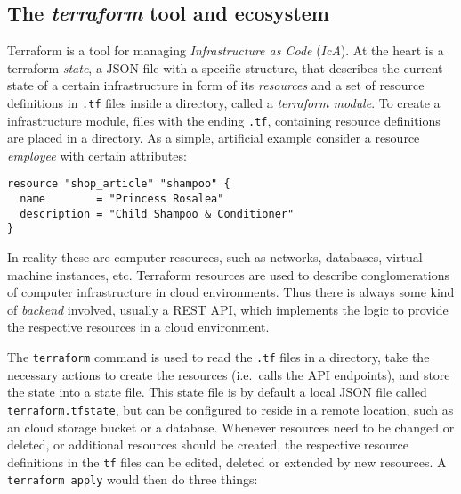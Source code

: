 \documentclass[paper=a4,fontsize=10pt,toc=listof,numbers=noenddot]{article}
\begin{document}
\subsection{The \emph{terraform} tool and ecosystem}
\label{subsec:terr-tool-ecosyst}

Terraform is a tool for managing \emph{Infrastructure as Code} (\emph{IcA}). At the heart is a terraform \emph{state}, a JSON file with a specific structure, that describes the current state of a certain infrastructure in form of its \emph{resources} and a set of resource definitions in \verb'.tf' files inside a directory, called a \emph{terraform module}. To create a infrastructure module, files with the ending \verb'.tf', containing resource definitions are placed in a directory. As a simple, artificial example consider a resource \emph{employee} with certain attributes:

\begin{lstlisting}[basicstyle=\ttfamily\footnotesize,numbers=none,frame=single]
resource "shop_article" "shampoo" {
  name        = "Princess Rosalea"
  description = "Child Shampoo & Conditioner"
}
\end{lstlisting}

In reality these are computer resources, such as networks, databases, virtual machine instances, etc. Terraform resources are used to describe conglomerations of computer infrastructure in cloud environments. Thus there is always some kind of \emph{backend} involved, usually a REST API, which implements the logic to provide the respective resources in a cloud environment.

The \verb'terraform' command is used to read the \verb'.tf' files in a directory, take the necessary actions to create the resources (i.e.\ calls the API endpoints), and store the state into a state file. This state file is by default a local JSON file called \verb'terraform.tfstate', but can be configured to reside in a remote location, such as an cloud storage bucket or a database. Whenever resources need to be changed or deleted, or additional resources should be created, the respective resource definitions in the \verb'tf' files can be edited, deleted or extended by new resources. A \verb'terraform apply' would then do three things:
\end{document}
